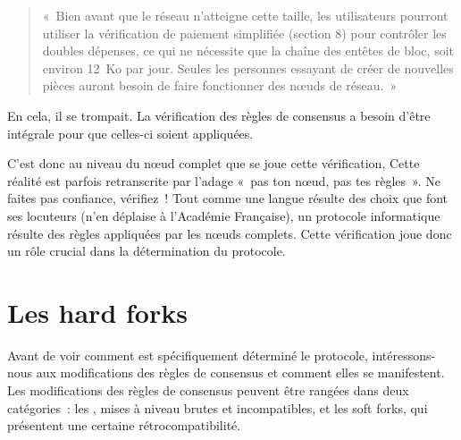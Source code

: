 \begin{quote}
«~Bien avant que le réseau n'atteigne cette taille, les utilisateurs pourront utiliser la vérification de paiement simplifiée (section 8) pour contrôler les doubles dépenses, ce qui ne nécessite que la chaîne des entêtes de bloc, soit environ 12~Ko par jour. Seules les personnes essayant de créer de nouvelles pièces auront besoin de faire fonctionner des nœuds de réseau.~»
\end{quote} %

En cela, il se trompait. La vérification des règles de consensus a besoin d'être intégrale pour que celles-ci soient appliquées.

C'est donc au niveau du nœud complet que se joue cette vérification, Cette réalité est parfois retranscrite par l'adage «~pas ton nœud, pas tes règles~». Ne faites pas confiance, vérifiez~! Tout comme une langue résulte des choix que font ses locuteurs (n'en déplaise à l'Académie Française), un protocole informatique résulte des règles appliquées par les nœuds complets. Cette vérification joue donc un rôle crucial dans la détermination du protocole.

\section*{Les hard forks}

Avant de voir comment est spécifiquement déterminé le protocole, intéressons-nous aux modifications des règles de consensus et comment elles se manifestent. Les modifications des règles de consensus peuvent être rangées dans deux catégories~: les , mises à niveau brutes et incompatibles, et les soft forks, qui présentent une certaine rétrocompatibilité.

